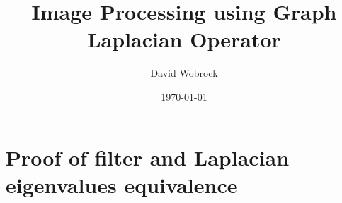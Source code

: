 \documentclass[]{kththesis}
\title{Image Processing using Graph Laplacian Operator}
\author{David Wobrock}
\date{\today}
\begin{document}
\frontmatter %

\titlepage

\begin{abstract}
 
\end{abstract}

\begin{otherlanguage}{swedish}
  \begin{abstract}
   
  \end{abstract}
\end{otherlanguage}

\begin{otherlanguage}{french}
  \begin{abstract}
   
  \end{abstract}
\end{otherlanguage}

\tableofcontents

\mainmatter %









\clearpage
\printbibliography

\appendix %

\chapter{Proof of filter and Laplacian eigenvalues equivalence}
\label{appendix:eigenvalue_proof}

\end{document}

